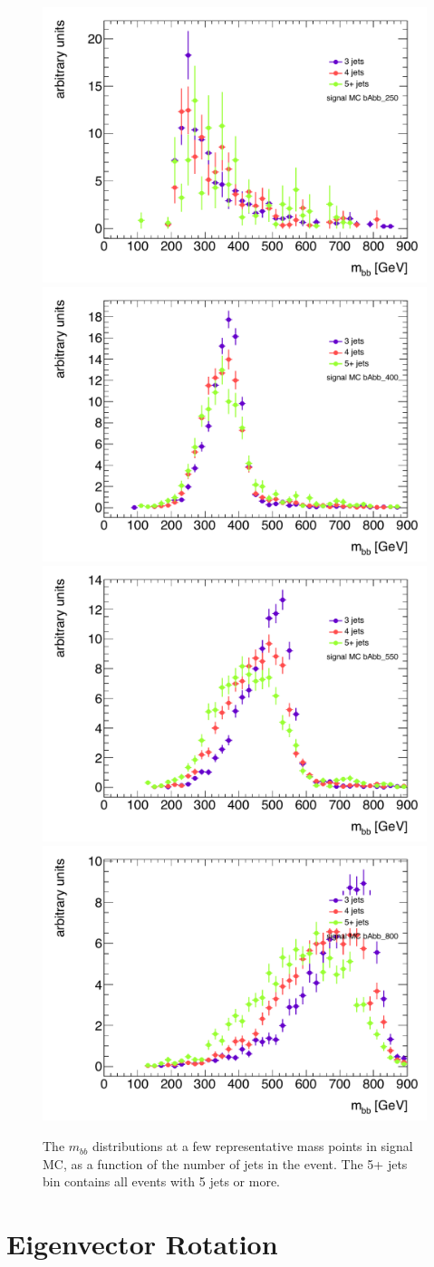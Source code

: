 \begin{figure}[hbt]
  \includegraphics[width=0.45\linewidth]{SignalKin/mbb_njets_bAbb_250.pdf}
  \includegraphics[width=0.45\linewidth]{SignalKin/mbb_njets_bAbb_400.pdf}
\newline
  \includegraphics[width=0.45\linewidth]{SignalKin/mbb_njets_bAbb_550.pdf}
  \includegraphics[width=0.45\linewidth]{SignalKin/mbb_njets_bAbb_800.pdf}
  \label{fig:mbb_njets_signal}
  \caption{The $m_{bb}$ distributions at a few representative mass points in signal MC, as a function of the number of jets in the event.  
    The 5+ jets bin contains all events with 5 jets or more.}
\end{figure}


\section{Eigenvector Rotation}

